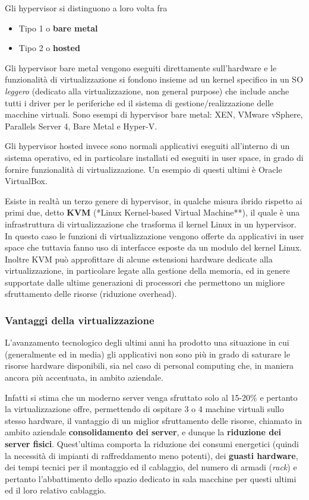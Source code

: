 \documentclass[italian,]{article}
\providecommand{\tightlist}{%
  \setlength{\itemsep}{0pt}\setlength{\parskip}{0pt}}
\begin{document}
Gli hypervisor si distinguono a loro volta fra

\begin{itemize}
\tightlist
\item
  Tipo 1 o \textbf{bare metal}
\item
  Tipo 2 o \textbf{hosted}
\end{itemize}

Gli hypervisor bare metal vengono eseguiti direttamente sull'hardware e
le funzionalità di virtualizzazione si fondono insieme ad un kernel
specifico in un SO \emph{leggero} (dedicato alla virtualizzazione, non
general purpose) che include anche tutti i driver per le periferiche ed
il sistema di gestione/realizzazione delle macchine virtuali. Sono
esempi di hypervisor bare metal: XEN, VMware vSphere, Parallels Server
4, Bare Metal e Hyper-V.

Gli hypervisor hosted invece sono normali applicativi eseguiti
all'interno di un sistema operativo, ed in particolare installati ed
eseguiti in user space, in grado di fornire funzionalità di
virtualizzazione. Un esempio di questi ultimi è Oracle VirtualBox.

Esiste in realtà un terzo genere di hypervisor, in qualche misura ibrido
rispetto ai primi due, detto \textbf{KVM} (*Linux Kernel-based Virtual
Machine**), il quale è una infrastruttura di virtualizzazione che
trasforma il kernel Linux in un hypervisor. In questo caso le funzioni
di virtualizzazione vengono offerte da applicativi in user space che
tuttavia fanno uso di interfacce esposte da un modulo del kernel Linux.
Inoltre KVM può approfittare di alcune estensioni hardware dedicate alla
virtualizzazione, in particolare legate alla gestione della memoria, ed
in genere supportate dalle ultime generazioni di processori che
permettono un migliore sfruttamento delle risorse (riduzione overhead).

\subsubsection{Vantaggi della
virtualizzazione}\label{vantaggi-della-virtualizzazione}

L'avanzamento tecnologico degli ultimi anni ha prodotto una situazione
in cui (generalmente ed in media) gli applicativi non sono più in grado
di saturare le risorse hardware disponibili, sia nel caso di personal
computing che, in maniera ancora più accentuata, in ambito aziendale.

Infatti si stima che un moderno server venga sfruttato solo al 15-20\% e
pertanto la virtualizzazione offre, permettendo di ospitare 3 o 4
machine virtuali sullo stesso hardware, il vantaggio di un miglior
sfruttamento delle risorse, chiamato in ambito aziendale
\textbf{consolidamento dei server}, e dunque la \textbf{riduzione dei
server fisici}. Quest'ultima comporta la riduzione dei consumi
energetici (quindi la necessità di impianti di raffreddamento meno
potenti), dei \textbf{guasti hardware}, dei tempi tecnici per il
montaggio ed il cablaggio, del numero di armadi (\emph{rack}) e pertanto
l'abbattimento dello spazio dedicato in sala macchine per questi ultimi
ed il loro relativo cablaggio.
\end{document}

